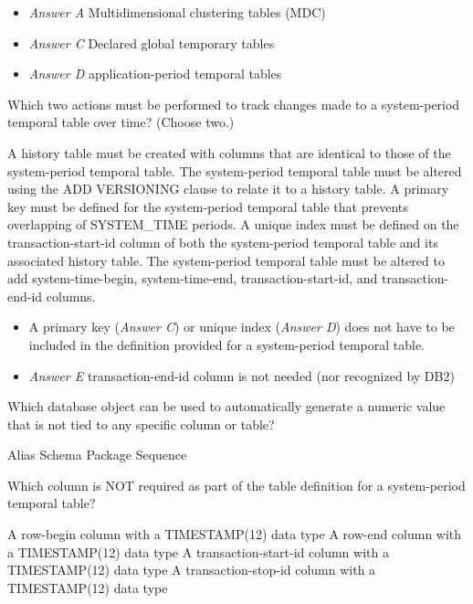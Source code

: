 \documentclass[answers, 11pt]{exam}
\begin{document}
\begin{questions}
\begin{solution}
	\begin{itemize}
		\item \textit{Answer A} Multidimensional clustering tables (MDC)
		\item \textit{Answer C} Declared global temporary tables
		\item \textit{Answer D} application-period temporal tables
	\end{itemize}
\end{solution}


\question[1]
Which two actions must be performed to track changes made to a system-period temporal table over time?
(Choose two.)
\begin{choices}
	\CorrectChoice A history table must be created with columns that are identical to those of the system-period
	temporal table.
	\CorrectChoice The system-period temporal table must be altered using the ADD VERSIONING clause to relate it to
	a history table.
	\choice A primary key must be defined for the system-period temporal table that prevents overlapping
	of SYSTEM\_TIME periods.
	\choice A unique index must be defined on the transaction-start-id column of both the system-period 
	temporal table and its associated history table.
	\choice The system-period temporal table must be altered to add system-time-begin, system-time-end, 
	transaction-start-id, and transaction-end-id columns.
\end{choices}

\begin{solution}
	\begin{itemize}
		\item A primary key (\textit{Answer C}) or unique index (\textit{Answer D}) does not have to be included in the definition provided
		for a system-period temporal table.
		\item \textit{Answer E} transaction-end-id column is not needed (nor recognized by DB2)
	\end{itemize}
\end{solution}

\question[1]
Which database object can be used to automatically generate a numeric value that is not tied to any
specific column or table?
\begin{choices}
	\choice Alias
	\choice Schema
	\choice Package
	\CorrectChoice Sequence
\end{choices}

\newpage
\question[1]
Which column is NOT required as part of the table definition for a system-period temporal table?
\begin{choices}
	\choice A row-begin column with a TIMESTAMP(12) data type
	\choice A row-end column with a TIMESTAMP(12) data type
	\choice A transaction-start-id column with a TIMESTAMP(12) data type
	\CorrectChoice A transaction-stop-id column with a TIMESTAMP(12) data type
\end{choices}


\end{questions}
\end{document}
